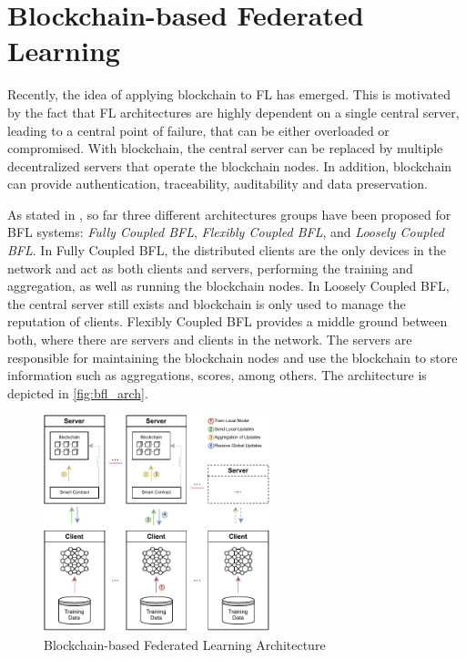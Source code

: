 \section{Blockchain-based Federated Learning}\label{background:bfl}

Recently, the idea of applying blockchain to FL has emerged. This is motivated by the fact that FL architectures are highly dependent on a single central server, leading to a central point of failure, that can be either overloaded or compromised. With blockchain, the central server can be replaced by multiple decentralized servers that operate the blockchain nodes. In addition, blockchain can provide authentication, traceability, auditability and data preservation.

As stated in \cite{10.48550/arxiv.2110.02182}, so far three different architectures groups have been proposed for BFL systems: \textit{Fully Coupled BFL}, \textit{Flexibly Coupled BFL}, and \textit{Loosely Coupled BFL}. In Fully Coupled BFL, the distributed clients are the only devices in the network and act as both clients and servers, performing the training and aggregation, as well as running the blockchain nodes. In Loosely Coupled BFL, the central server still exists and blockchain is only used to manage the reputation of clients. Flexibly Coupled BFL provides a middle ground between both, where there are servers and clients in the network. The servers are responsible for maintaining the blockchain nodes and use the blockchain to store information such as aggregations, scores, among others. The architecture is depicted in \autoref{fig:bfl_arch}.

\begin{figure}[!ht]
    \centering
    \centering
    \includegraphics[width=0.6\textwidth]{graphics/bfl-architecture.pdf}
    \caption{Blockchain-based Federated Learning Architecture}
    \label{fig:bfl_arch}
\end{figure}



